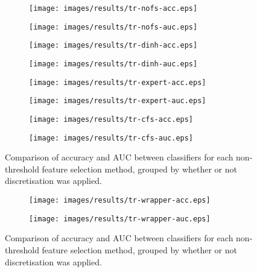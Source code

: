 \begin{figure}[htbp]
\begin{subfigure}{.48\textwidth}
\texttt{[image: images/results/tr-nofs-acc.eps]}
\caption{}
\label{}
\end{subfigure}%
\begin{subfigure}{.55\textwidth}
\texttt{[image: images/results/tr-nofs-auc.eps]}
\caption{}
\label{}
\end{subfigure}

\begin{subfigure}{.48\textwidth}
\texttt{[image: images/results/tr-dinh-acc.eps]}
\caption{}
\label{}
\end{subfigure}%
\begin{subfigure}{.55\textwidth}
\texttt{[image: images/results/tr-dinh-auc.eps]}
\caption{}
\label{}
\end{subfigure}

\begin{subfigure}{.48\textwidth}
\texttt{[image: images/results/tr-expert-acc.eps]}
\caption{}
\label{}
\end{subfigure}%
\begin{subfigure}{.55\textwidth}
\texttt{[image: images/results/tr-expert-auc.eps]}
\caption{}
\label{}
\end{subfigure}

\begin{subfigure}{.48\textwidth}
\texttt{[image: images/results/tr-cfs-acc.eps]}
\caption{}
\label{fig:tr-nothreshold-cfs-acc}
\end{subfigure}%
\begin{subfigure}{.55\textwidth}
\texttt{[image: images/results/tr-cfs-auc.eps]}
\caption{}
\label{}
\end{subfigure}
\caption{Comparison of accuracy and AUC between classifiers for each non-threshold feature selection method, grouped by whether or not discretisation was applied.}
\label{fig:tr-nothreshold}
\end{figure}

\begin{figure}
\ContinuedFloat

\begin{subfigure}{.48\textwidth}
\texttt{[image: images/results/tr-wrapper-acc.eps]}
\caption{}
\label{}
\end{subfigure}%
\begin{subfigure}{.55\textwidth}
\texttt{[image: images/results/tr-wrapper-auc.eps]}
\caption{}
\label{}
\end{subfigure}
\caption{Comparison of accuracy and AUC between classifiers for each non-threshold feature selection method, grouped by whether or not discretisation was applied.}
\label{}
\end{figure}

